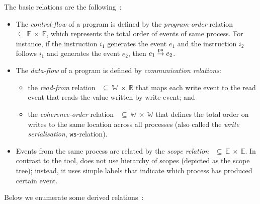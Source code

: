 \vspace{1em}
The basic relations are the following~\cite{alglave2010shared}:
\begin{itemize}
    \item The \textit{control-flow} of a program is defined by the \textit{program-order} relation \po~$\subseteq~\mathbb{E}~\times~\mathbb{E}$, which represents the total order of events of same process.
    For instance, if the instruction $i_1$ generates the event $e_1$ and the instruction $i_2$ follows $i_1$ and generates the event $e_2$, then $e_1 \overset{\texttt{po}}{\rightarrow} e_2$.

    \item The \textit{data-flow} of a program is defined by \textit{communication relations}:
    \begin{itemize}[noitemsep]
        \item the \textit{read-from} relation \rf{}~$\subseteq~\mathbb{W}~\times~\mathbb{R}$ that maps each write event to the read event that reads the value written by write event; and
        \item the \textit{coherence-order} relation \co{}~$\subseteq~\mathbb{W}~\times~\mathbb{W}$ that defines the total order on writes to the same location across all processes (also called the \textit{write serialisation}, \texttt{ws}-relation).
    \end{itemize}

    \item Events from the same process are related by the \textit{scope relation} \sr{}~$\subseteq~\mathbb{E}~\times~\mathbb{E}$.
    In contrast to the  tool, \porthos[2] does not use hierarchy of scopes (depicted as the scope tree); instead, it uses simple labels that indicate which process has produced certain event.
\end{itemize}


Below we enumerate some derived relations~\cite{alglave2010shared}:

